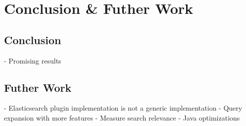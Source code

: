 \chapter{Conclusion \& Futher Work}
\label{ch:conclusion}

\section{Conclusion}
- Promising results
\section{Futher Work}
- Elasticsearch plugin implementation is not a generic implementation
- Query expansion with more features
- Measure search relevance
- Java optimizations
